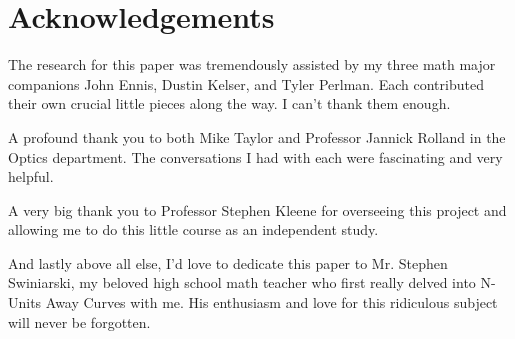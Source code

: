 \section{Acknowledgements}

The research for this paper was tremendously assisted by my three math major
companions John Ennis, Dustin Kelser, and Tyler Perlman. Each contributed their own crucial little pieces along the way. I can’t thank them enough.

A profound thank you to both Mike Taylor and Professor Jannick Rolland in the Optics
department. The conversations I had with each were fascinating and very helpful.

A very big thank you to Professor Stephen Kleene for overseeing this project and allowing me to do this little course as an independent study.

And lastly above all else, I’d love to dedicate this paper to Mr. Stephen Swiniarski, my beloved high school math teacher who first really delved into N-Units Away Curves with me. His enthusiasm and love for this ridiculous subject will never be forgotten.
